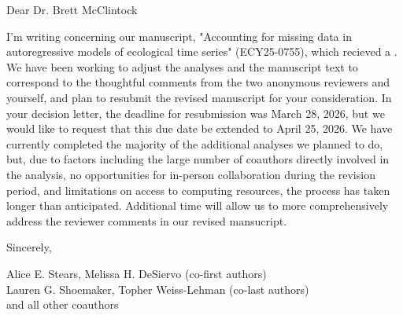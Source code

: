 \documentclass{article}
\begin{document}










\bigskip %

Dear Dr. Brett McClintock

\mediumskip %

I'm writing concerning our manuscript, "Accounting for missing data in autoregressive models of ecological time series" (ECY25-0755), which recieved a . We have been working to adjust the analyses and the manuscript text to correspond to the thoughtful comments from the two anonymous reviewers and yourself, and plan to resubmit the revised manuscript for your consideration. In your decision letter, the deadline for resubmission was March 28, 2026, but we would like to request that this due date be extended to April 25, 2026. We have currently completed the majority of the additional analyses we planned to do, but, due to factors including the large number of coauthors directly involved in the analysis, no opportunities for in-person collaboration during the revision period, and limitations on access to computing resources, the process has taken longer than anticipated. Additional time will allow us to more comprehensively address the reviewer comments in our revised mansucript. 

Sincerely,

Alice E. Stears,  Melissa H. DeSiervo (co-first authors) \\
Lauren G. Shoemaker, Topher Weiss-Lehman (co-last authors) \\
and all other coauthors


\vspace{25pt} %
\end{document}
